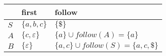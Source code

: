 \documentclass{standalone}
\providecommand\lightrule{%
	\arrayrulecolor{black!30}%
	\midrule[\lightrulewidth]%
	\arrayrulecolor{black}}
\begin{document}
\begin{tabularx}{\textwidth}{XXX}
        & first & follow \\
        \midrule
            \(S\)
            &
            \(\{a, b, c\}\)
            &
            \(\{\$\}\)
            \\ \lightrule
            \(A\)
            &
            \(\{c, \varepsilon\}\)
            &
            \(\{a\} \cup follow(A) = \{a\}\)
            \\ \lightrule
            \(B\)
            &
            \(\{\varepsilon\}\)
            &
            \(\{a, c\} \cup follow(S) = \{a, c, \$\}\)
    \end{tabularx}
\end{document}
